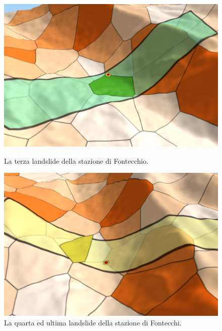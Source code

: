 	\begin{figure}[h]
		\hspace{0.1\linewidth}
		\begin{minipage}[t]{0.35\linewidth}
			\centering
			\includegraphics[width=1\textwidth]{images/FontecchioLandslide3}
			\caption{La terza landslide della stazione di Fontecchio.}
			\label{fontecchiolandslide3}
		\end{minipage}
		\hspace{0.1\linewidth}
		\begin{minipage}[t]{0.35\linewidth}
			\centering
			\includegraphics[width=1\textwidth]{images/FontecchioLandslide4}
			\caption{La quarta ed ultima landslide della stazione di Fontecchi.}
			\label{fontecchiolandslide4}
		\end{minipage}
	\end{figure}